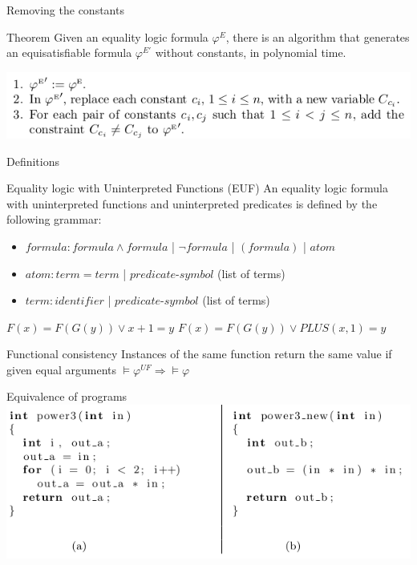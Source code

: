 \documentclass{beamer}
\begin{document}
\begin{frame}{Removing the constants}
\begin{block}{Theorem}
Given an equality logic formula $\varphi^E$, there is an algorithm that generates an equisatisfiable formula $\varphi^{E'}$ without constants, in polynomial time.
\end{block}
\includegraphics[scale=0.5]{Removing_constants.png}
\end{frame}

\begin{frame}{Definitions}
\begin{block}{Equality logic with Uninterpreted Functions (EUF)}
An equality logic formula with uninterpreted functions and uninterpreted predicates is defined by the following grammar:
\begin{itemize}
\item $formula: formula \wedge formula$ | $\lnot formula$ | $(formula)$ | $atom$
\item $atom : term = term$ | $predicate$-$symbol$ (list of terms)
\item $term : identifier$ | $predicate$-$symbol$ (list of terms)
\end{itemize}
\end{block}
$F(x) = F(G(y)) \vee x + 1 = y$\newline
$F(x) = F(G(y)) \vee PLUS(x, 1) = y$\newline
\begin{block}{Functional consistency}
Instances of the same function return the same value if given equal arguments\newline
$\vDash \varphi^{UF} \Rightarrow \vDash \varphi$
\end{block}
\end{frame}

\begin{frame}{Equivalence of programs}
\includegraphics[scale=0.5]{power3.png}
\end{frame}
\end{document}
